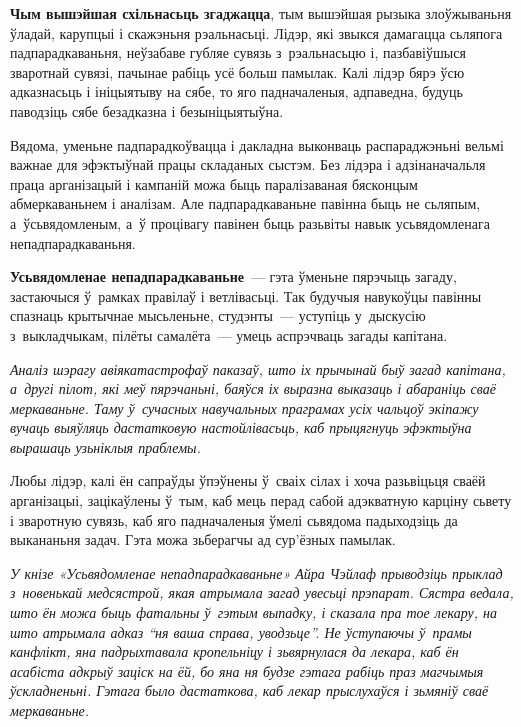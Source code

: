 \textbf{Чым вышэйшая схільнасьць згаджацца}, тым вышэйшая рызыка злоўжываньня ўладай, карупцыі і скажэньня рэальнасьці. Лідэр, які звыкся дамагацца сьляпога падпарадкаваньня, неўзабаве губляе сувязь з~рэальнасьцю і, пазбавіўшыся зваротнай сувязі, пачынае рабіць усё больш памылак. Калі лідэр бярэ ўсю адказнасьць і ініцыятыву на сябе, то яго падначаленыя, адпаведна, будуць паводзіць сябе безадказна і безыніцыятыўна. 


Вядома, уменьне падпарадкоўвацца і дакладна выконваць распараджэньні вельмі важнае для эфэктыўнай працы складаных сыстэм. Без лідэра і адзінаначальля праца арганізацый і кампаній можа быць паралізаваная бясконцым абмеркаваньнем і аналізам. Але падпарадкаваньне павінна быць не сьляпым, а~ўсьвядомленым, а~ў процівагу павінен быць разьвіты навык усьвядомленага непадпарадкаваньня. 

\textbf{Усьвядомленае непадпарадкаваньне}~--- гэта ўменьне пярэчыць загаду, застаючыся ў~рамках правілаў і ветлівасьці. Так будучыя навукоўцы павінны спазнаць крытычнае мысьленьне, студэнты~--- уступіць у~дыскусію з~выкладчыкам, пілёты самалёта~--- умець аспрэчваць загады капітана.

\emph{Аналіз шэрагу авіякатастрофаў паказаў, што іх прычынай быў загад капітана, а~другі пілот, які меў пярэчаньні, баяўся іх выразна выказаць і абараніць сваё меркаваньне. Таму ў~сучасных навучальных праграмах усіх чальцоў экіпажу вучаць выяўляць дастатковую настойлівасьць, каб прыцягнуць эфэктыўна вырашаць узьніклыя праблемы.}

Любы лідэр, калі ён сапраўды ўпэўнены ў~сваіх сілах і хоча разьвіцьця сваёй арганізацыі, зацікаўлены ў~тым, каб мець перад сабой адэкватную карціну сьвету і зваротную сувязь, каб яго падначаленыя ўмелі сьвядома падыходзіць да выкананьня задач. Гэта можа зьберагчы ад сур'ёзных памылак.

\emph{У кнізе «Усьвядомленае непадпарадкаваньне» Айра Чэйлаф прыводзіць прыклад з~новенькай медсястрой, якая атрымала загад увесьці прэпарат. Сястра ведала, што ён можа быць фатальны ў~гэтым выпадку, і сказала пра тое лекару, на што атрымала адказ ``ня ваша справа, уводзьце''. Не ўступаючы ў~прамы канфлікт, яна падрыхтавала кропельніцу і зьвярнулася да лекара, каб ён асабіста адкрыў заціск на ёй, бо яна ня будзе гэтага рабіць праз магчымыя ўскладненьні. Гэтага было дастаткова, каб лекар прыслухаўся і зьмяніў сваё меркаваньне.} 

